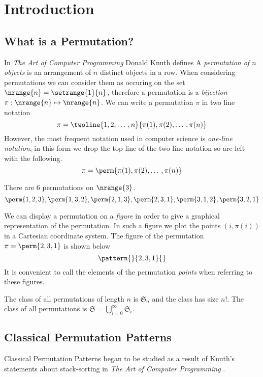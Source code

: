 \chapter{Introduction\label{cha:introduction}}
\section{What is a Permutation?}
In \emph{The Art of Computer Programming}\cite[p.~45]{Knuth:1997:ACP:260999} Donald Knuth defines
A \emph{permutation of \(n\) objects} is an arrangement of \(n\) distinct
objects in a row. When considering permutations we can consider them as
occuring on the set \(\nrange{n} = \setrange{1}{n}\), therefore a permutation
is a \emph{bijection} \(\pi:\nrange{n} \mapsto \nrange{n}\). We can write a
permutation \(\pi\) in two line notation
\begin{equation*}
\pi = \twoline{1,2,\dotso,n}{\pi(1),\pi(2),\dotso,\pi(n)}
\end{equation*}
However, the most frequent notation used in computer science is
\emph{one-line notation}, in this form we drop the top line of the two line
notation so are left with the following.
\begin{equation*}
\pi = \perm{\pi(1),\pi(2),\dotso,\pi(n)}
\end{equation*}

\begin{example}
There are 6 permutations on \(\nrange{3}\).
\begin{equation*}
\perm{1,2,3},\perm{1,3,2},\perm{2,1,3},\perm{2,3,1}, \perm{3,1,2}, \perm{3,2,1}
\end{equation*}
\end{example}

We can display a permutation on a \emph{figure} in order to give a graphical
representation of the permutation. In such a figure we plot the points
\((i,\pi(i))\) in a Cartesian coordinate system. The figure of the permutation
\(\pi = \perm{2,3,1}\) is shown below
\begin{equation*}
    \pattern{}{2,3,1}{}
\end{equation*}
It is convenient to call the elements of the permutation \emph{points} when
referring to these figures.

The class of all permutations of length \(n\) is \(\mathfrak{S}_n\) and
the class has size \(n!\). The class of all permutations is
\(\mathfrak{S}=\bigcup_{i=0}^{\infty}\mathfrak{S}_i\).

\section{Classical Permutation Patterns}
Classical Permutation Patterns began to be studied as a result of Knuth's
statements about stack-sorting in \emph{The Art of Computer Programming}
\cite[p.~243, Ex.~5,6]{Knuth:1997:ACP:260999}.

